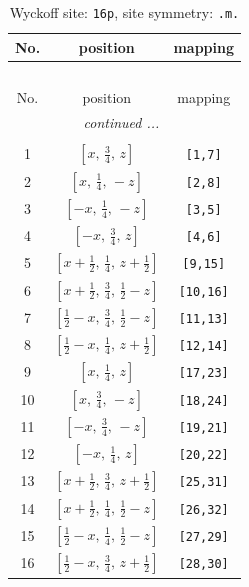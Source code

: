 \documentclass[fleqn,8pt]{jsarticle}
\begin{document}
\renewcommand{\arraystretch}{1.2}
\begin{longtable}{ccc}
\caption{Wyckoff site: {\tt 16p}, site symmetry: {\tt .m.}}
 \\
 \hline \hline
No. & position & mapping \\ \hline \endfirsthead

\multicolumn{2}{l}{\tablename\ \thetable{}} \\
 \hline \hline
No. & position & mapping \\ \hline \endhead

 \hline \hline
\multicolumn{2}{r}{\footnotesize\it continued ...} \\ \endfoot

 \hline \hline
\multicolumn{2}{r}{} \\ \endlastfoot

1 & $\left[ x,\, \frac{3}{4},\, z \right]$ & {\tt [1,7]} \\ \hline
2 & $\left[ x,\, \frac{1}{4},\, - z \right]$ & {\tt [2,8]} \\ \hline
3 & $\left[ - x,\, \frac{1}{4},\, - z \right]$ & {\tt [3,5]} \\ \hline
4 & $\left[ - x,\, \frac{3}{4},\, z \right]$ & {\tt [4,6]} \\ \hline
5 & $\left[ x + \frac{1}{2},\, \frac{1}{4},\, z + \frac{1}{2} \right]$ & {\tt [9,15]} \\ \hline
6 & $\left[ x + \frac{1}{2},\, \frac{3}{4},\, \frac{1}{2} - z \right]$ & {\tt [10,16]} \\ \hline
7 & $\left[ \frac{1}{2} - x,\, \frac{3}{4},\, \frac{1}{2} - z \right]$ & {\tt [11,13]} \\ \hline
8 & $\left[ \frac{1}{2} - x,\, \frac{1}{4},\, z + \frac{1}{2} \right]$ & {\tt [12,14]} \\ \hline
9 & $\left[ x,\, \frac{1}{4},\, z \right]$ & {\tt [17,23]} \\ \hline
10 & $\left[ x,\, \frac{3}{4},\, - z \right]$ & {\tt [18,24]} \\ \hline
11 & $\left[ - x,\, \frac{3}{4},\, - z \right]$ & {\tt [19,21]} \\ \hline
12 & $\left[ - x,\, \frac{1}{4},\, z \right]$ & {\tt [20,22]} \\ \hline
13 & $\left[ x + \frac{1}{2},\, \frac{3}{4},\, z + \frac{1}{2} \right]$ & {\tt [25,31]} \\ \hline
14 & $\left[ x + \frac{1}{2},\, \frac{1}{4},\, \frac{1}{2} - z \right]$ & {\tt [26,32]} \\ \hline
15 & $\left[ \frac{1}{2} - x,\, \frac{1}{4},\, \frac{1}{2} - z \right]$ & {\tt [27,29]} \\ \hline
16 & $\left[ \frac{1}{2} - x,\, \frac{3}{4},\, z + \frac{1}{2} \right]$ & {\tt [28,30]} \\
\end{longtable}
\end{document}
